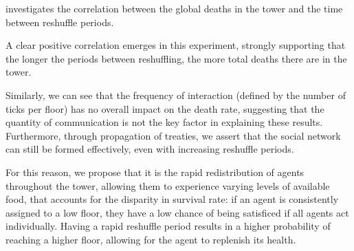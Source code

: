  investigates the correlation between the global deaths in the tower and the time between reshuffle periods.

A clear positive correlation emerges in this experiment, strongly supporting that the longer the periods between reshuffling, the more total deaths there are in the tower.

Similarly, we can see that the frequency of interaction (defined by the number of ticks per floor) has no overall impact on the death rate, suggesting that the quantity of communication is not the key factor in explaining these results. Furthermore, through propagation of treaties, we assert that the social network can still be formed effectively, even with increasing reshuffle periods.

For this reason, we propose that it is the rapid redistribution of agents throughout the tower, allowing them to experience varying levels of available food, that accounts for the disparity in survival rate: if an agent is consistently assigned to a low floor, they have a low chance of being satisficed if all agents act individually. Having a rapid reshuffle period results in a higher probability of reaching a higher floor, allowing for the agent to replenish its health. 

